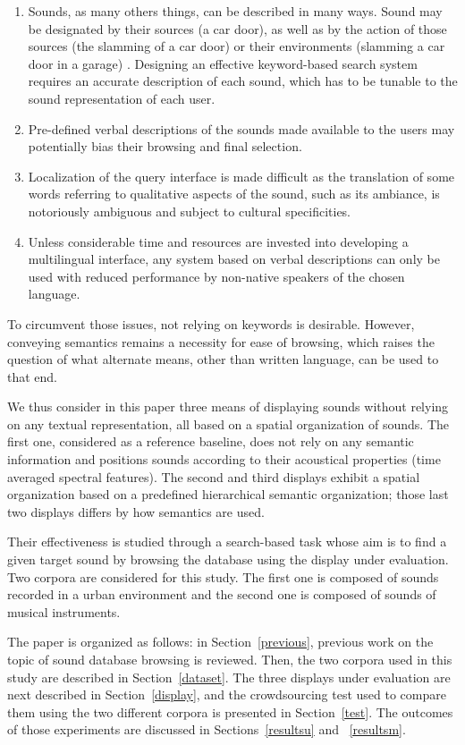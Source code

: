 \documentclass{aes2e}
\begin{document}
\begin{enumerate}
\item Sounds, as many others things, can be described in many ways. Sound may be designated by their
sources (a car door), as well as by the action of those sources (the slamming of a car door) or their environments (slamming a car door in a garage) \cite{houix2012lexical, niessen2010categories, brown2011towards}. Designing an effective keyword-based search system requires an accurate description of each sound, which has to be tunable to the sound representation of each user.
\item Pre-defined verbal descriptions of the sounds made available to the users may potentially bias their browsing and final selection.
\item Localization of the query interface is made difficult as the translation of some words referring to qualitative aspects of the sound, such as its ambiance, is notoriously ambiguous and subject to cultural specificities.
\item Unless considerable time and resources are invested into developing a multilingual interface, any system based on verbal descriptions can only be used with reduced performance by non-native speakers of the chosen language.
\end{enumerate}
To circumvent those issues, not relying on keywords is desirable. However, conveying semantics remains a necessity for ease of browsing, which raises the question of what alternate means, other than written language, can be used to that end.

We thus consider in this paper three means of displaying sounds without relying on any textual representation, all based on a spatial organization of sounds. The first one, considered as a reference baseline, does not rely on any semantic information and positions sounds according to their acoustical properties (time averaged spectral features). The second and third displays exhibit a spatial organization based  on a predefined hierarchical semantic organization; those last two displays differs by how semantics are used.

Their effectiveness is studied through a search-based task whose aim is to find a given target sound by browsing the database using the display under evaluation. Two corpora are considered for this study. The first one is composed of sounds recorded in a urban environment and the second one is composed of sounds of musical instruments.

The paper is organized as follows: in Section~\ref{previous}, previous work on the topic of sound database browsing is reviewed. Then, the two corpora used in this study are described in Section~\ref{dataset}. The three displays under evaluation are next described in Section~\ref{display}, and the crowdsourcing test used to compare them using the two different corpora is presented in Section~\ref{test}. The outcomes of those experiments are discussed in Sections~\ref{resultsu} and ~\ref{resultsm}.  
\end{document}
